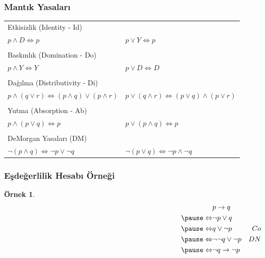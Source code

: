 \documentclass[dvipsnames]{beamer}
\theoremstyle{definition}
\theoremstyle{example}
\newtheorem{ornek}[theorem]{Örnek}
\theoremstyle{plain}
\begin{document}
\begin{frame}
  \frametitle{Mantık Yasaları}

  \begin{tabular}{ll}
  \alert{Etkisizlik (Identity - Id)} &\\
    $p \wedge D \Leftrightarrow p$ &
    $p \vee Y \Leftrightarrow p$\\\\
  \pause
  \alert{Baskınlık (Domination - Do)} &\\
    $p \wedge Y \Leftrightarrow Y$ &
    $p \vee D \Leftrightarrow D$\\\\
  \pause
  \alert{Dağılma (Distributivity - Di)} &\\
    $p \wedge (q \vee r) \Leftrightarrow (p \wedge q) \vee (p \wedge r)$ &
    $p \vee (q \wedge r) \Leftrightarrow (p \vee q) \wedge (p \vee r)$\\\\
  \pause
  \alert{Yutma (Absorption - Ab)} &\\
    $p \wedge (p \vee q) \Leftrightarrow p$ &
    $p \vee (p \wedge q) \Leftrightarrow p$\\\\
  \pause
  \alert{DeMorgan Yasaları (DM)} &\\
    $\neg (p \wedge q) \Leftrightarrow \neg p \vee \neg q$ &
    $\neg (p \vee q) \Leftrightarrow \neg p \wedge \neg q$
  \end{tabular}
\end{frame}

\begin{frame}
  \frametitle{Eşdeğerlilik Hesabı Örneği}

  \begin{ornek}
    \begin{eqnarray*}
                      & p \rightarrow q           &   \\
      \pause
      \Leftrightarrow & \neg p \vee q             &   \\
      \pause
      \Leftrightarrow & q \vee \neg p             & Co\\
      \pause
      \Leftrightarrow & \neg \neg q \vee \neg p   & DN\\
      \pause
      \Leftrightarrow & \neg q \rightarrow \neg p &
    \end{eqnarray*}
  \end{ornek}
\end{frame}
\end{document}
